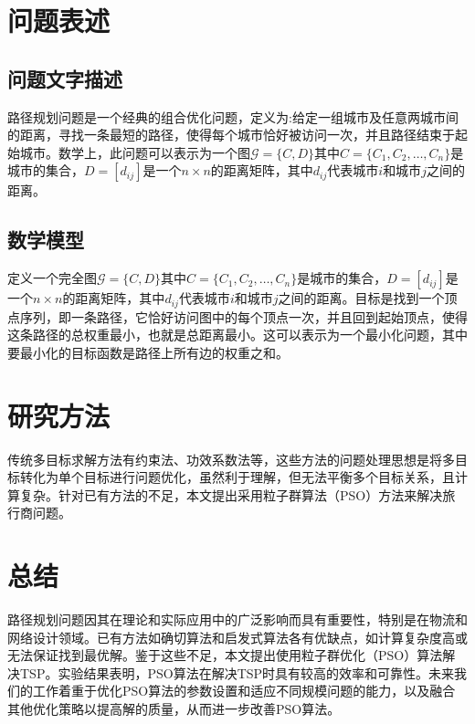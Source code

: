 \documentclass{ctexart}
\begin{document}
\section{问题表述}
\subsection{问题文字描述}
路径规划问题是一个经典的组合优化问题，定义为:给定一组城市及任意两城市间的距离，寻找一条最短的路径，使得每个城市恰好被访问一次，并且路径结束于起始城市\cite{ref8}。数学上，此问题可以表示为一个图$\mathcal{G}=\{C,D\}$其中$C=\{C_1,C_2,\dots,C_n\}$是城市的集合，$D=[d_{ij}]$是一个$n{\times}n$的距离矩阵，其中$d_{ij}$代表城市$i$和城市$j$之间的距离。
\subsection{数学模型}
定义一个完全图$\mathcal{G}=\{C,D\}$其中$C=\{C_1,C_2,\dots,C_n\}$是城市的集合，$D=[d_{ij}]$是一个$n{\times}n$的距离矩阵，其中$d_{ij}$代表城市$i$和城市$j$之间的距离。目标是找到一个顶点序列，即一条路径，它恰好访问图中的每个顶点一次，并且回到起始顶点，使得这条路径的总权重最小，也就是总距离最小。这可以表示为一个最小化问题，其中要最小化的目标函数是路径上所有边的权重之和。

\section{研究方法}
传统多目标求解方法有约束法、功效系数法等，这些方法的问题处理思想是将多目标转化为单个目标进行问题优化，虽然利于理解，但无法平衡多个目标关系，且计算复杂\cite{ref9}。针对已有方法的不足，本文提出采用粒子群算法（PSO）方法来解决旅行商问题。
\section{总结}
路径规划问题因其在理论和实际应用中的广泛影响而具有重要性，特别是在物流和网络设计领域。已有方法如确切算法和启发式算法各有优缺点，如计算复杂度高或无法保证找到最优解。鉴于这些不足，本文提出使用粒子群优化（PSO）算法解决TSP。实验结果表明，PSO算法在解决TSP时具有较高的效率和可靠性。未来我们的工作着重于优化PSO算法的参数设置和适应不同规模问题的能力，以及融合其他优化策略以提高解的质量，从而进一步改善PSO算法。

% 
% 


\end{document}
